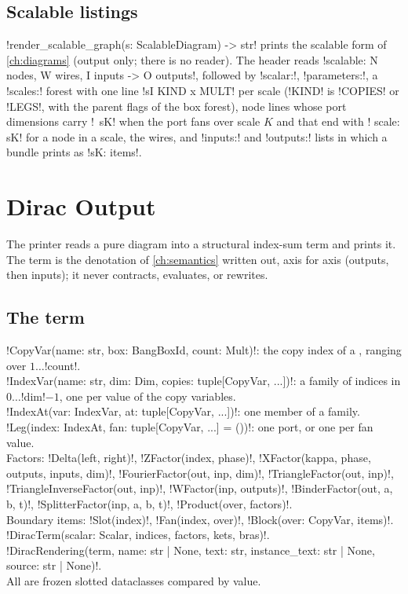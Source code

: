 \subsection{Scalable listings}

\py!render_scalable_graph(s: ScalableDiagram) -> str! prints the scalable form of \cref{ch:diagrams} (output only; there is no reader). The header reads \code!scalable: N nodes, W wires, I inputs -> O outputs!, followed by \code!scalar:!, \code!parameters:!, a \code!scales:! forest with one line \code!sI  KIND x MULT! per scale (\code!KIND! is \code!COPIES! or \code!LEGS!, with the parent flags of the box forest), node lines whose port dimensions carry \code!~sK! when the port fans over scale $K$ and that end with \code!  scale: sK! for a node in a scale, the wires, and \code!inputs:! and \code!outputs:! lists in which a bundle prints as \code!{sK: items}!.

\section{Dirac Output}\label{sec:language-dirac-out}

The printer reads a pure diagram into a structural index-sum term and prints it. The term is the denotation of \cref{ch:semantics} written out, axis for axis (outputs, then inputs); it never contracts, evaluates, or rewrites.

\subsection{The term}

\begin{signature}
\py!CopyVar(name: str, box: BangBoxId, count: Mult)!: the copy index of a \bbox{}, ranging over $1\ldots$\py!count!.\\
\py!IndexVar(name: str, dim: Dim, copies: tuple[CopyVar, ...])!: a family of indices in $0\ldots$\py!dim!$-1$, one per value of the copy variables.\\
\py!IndexAt(var: IndexVar, at: tuple[CopyVar, ...])!: one member of a family.\\
\py!Leg(index: IndexAt, fan: tuple[CopyVar, ...] = ())!: one port, or one per fan value.\\
Factors: \py!Delta(left, right)!, \py!ZFactor(index, phase)!, \py!XFactor(kappa, phase, outputs, inputs, dim)!, \py!FourierFactor(out, inp, dim)!, \py!TriangleFactor(out, inp)!, \py!TriangleInverseFactor(out, inp)!, \py!WFactor(inp, outputs)!, \py!BinderFactor(out, a, b, t)!, \py!SplitterFactor(inp, a, b, t)!, \py!Product(over, factors)!.\\
Boundary items: \py!Slot(index)!, \py!Fan(index, over)!, \py!Block(over: CopyVar, items)!.\\
\py!DiracTerm(scalar: Scalar, indices, factors, kets, bras)!.\\
\py!DiracRendering(term, name: str | None, text: str, instance_text: str | None, source: str | None)!.\\
All are frozen slotted dataclasses compared by value.
\end{signature}

